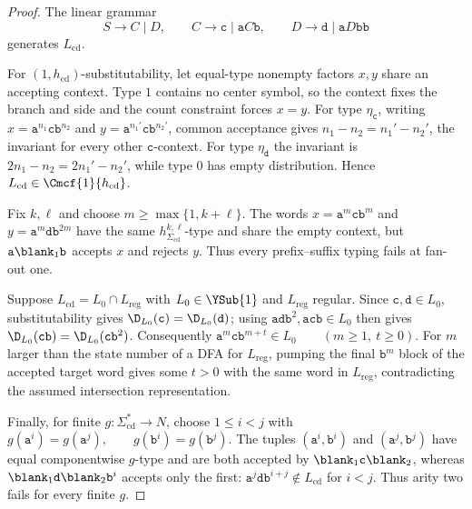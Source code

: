 \begin{proof}
The linear grammar
\[
  S\to C\mid D,\qquad
  C\to\mathtt c\mid\mathtt a C\mathtt b,\qquad
  D\to\mathtt d\mid\mathtt a D\mathtt b\mathtt b
\]
generates $L_{\mathrm{cd}}$.

For $(1,h_{\mathrm{cd}})$-substitutability, let equal-type nonempty factors
$x,y$ share an accepting context.  Type $1$ contains no center symbol, so the
context fixes the branch and side and the count constraint forces $x=y$.
For type $\eta_{\mathtt c}$, writing
$x=\mathtt a^{n_1}\mathtt c\mathtt b^{n_2}$ and
$y=\mathtt a^{n_1'}\mathtt c\mathtt b^{n_2'}$, common acceptance gives
$n_1-n_2=n_1'-n_2'$, the invariant for every other $\mathtt c$-context.
For type $\eta_{\mathtt d}$ the invariant is
$2n_1-n_2=2n_1'-n_2'$, while type $0$ has empty distribution.  Hence
$L_{\mathrm{cd}}\in\Cmcf{1}{h_{\mathrm{cd}}}$.

Fix $k,\ell$ and choose $m\ge\max\{1,k+\ell\}$.  The words
$x=\mathtt a^m\mathtt c\mathtt b^m$ and
$y=\mathtt a^m\mathtt d\mathtt b^{2m}$ have the same
$h_{\Sigma_{\mathrm{cd}}}^{k,\ell}$-type and share the empty context, but
$\mathtt a\blank_1\mathtt b$ accepts $x$ and rejects $y$.  Thus every
prefix--suffix typing fails at fan-out one.

Suppose $L_{\mathrm{cd}}=L_0\cap L_{\mathrm{reg}}$ with
$L_0\in\YSub{1}$ and $L_{\mathrm{reg}}$ regular.  Since
$\mathtt c,\mathtt d\in L_0$, substitutability gives
$\D_{L_0}(\mathtt c)=\D_{L_0}(\mathtt d)$; using
$\mathtt a\mathtt d\mathtt b^2,\mathtt a\mathtt c\mathtt b\in L_0$ then gives
$\D_{L_0}(\mathtt c\mathtt b)=\D_{L_0}(\mathtt c\mathtt b^2)$.
Consequently
\(\mathtt a^m\mathtt c\mathtt b^{m+t}\in L_0 \qquad(m\ge1,\ t\ge0).\)
For $m$ larger than the state number of a DFA for $L_{\mathrm{reg}}$, pumping
the final $\mathtt b^m$ block of the accepted target word gives some $t>0$
with the same word in $L_{\mathrm{reg}}$, contradicting the assumed
intersection representation.

Finally, for finite $g:\Sigma_{\mathrm{cd}}^*\to N$, choose $1\le i<j$ with
\(g(\mathtt a^i)=g(\mathtt a^j),\qquad g(\mathtt b^i)=g(\mathtt b^j).\)
The tuples $(\mathtt a^i,\mathtt b^i)$ and
$(\mathtt a^j,\mathtt b^j)$ have equal componentwise $g$-type and are both
accepted by $\blank_1\mathtt c\blank_2$, whereas
$\blank_1\mathtt d\blank_2\mathtt b^i$ accepts only the first:
$\mathtt a^j\mathtt d\mathtt b^{i+j}\notin L_{\mathrm{cd}}$ for $i<j$.
Thus arity two fails for every finite $g$.
\end{proof}

